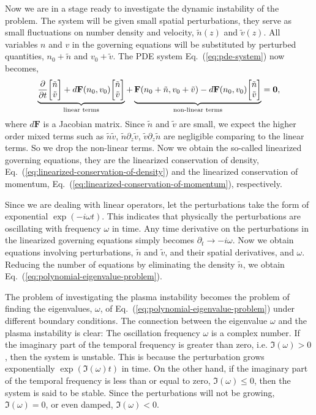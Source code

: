 Now we are in a stage ready to investigate the dynamic instability of the problem. The system will be given small spatial perturbations, they serve as small fluctuations on number density and velocity, $\tilde{n}(z)$ and $\tilde{v}(z)$. All variables $n$ and $v$ in the governing equations will be substituted by perturbed quantities, $n_0+\tilde{n}$ and $v_0+\tilde{v}$. The PDE system Eq.~(\ref{eq:pde-system}) now becomes,
\begin{equation}
	\underbrace{\pdv{t}\mqty[\tilde{n}\\ \tilde{v}] + d\mathbf{F}(n_0,v_0)\mqty[\tilde{n}\\ \tilde{v}] }_{\text{linear terms}}
	+ \underbrace{\mathbf{F}(n_0+\tilde{n}, v_0+\tilde{v}) - d\mathbf{F}(n_0,v_0)\mqty[\tilde{n}\\ \tilde{v}]}_{\text{non-linear terms}}
	= \mathbf{0},
	\label{eq:perturbed-pde-system}
\end{equation}
where $d\mathbf{F}$ is a Jacobian matrix. Since $\tilde{n}$ and $\tilde{v}$ are small, we expect the higher order mixed terms such as $\tilde{n}\tilde{v}$, $\tilde{n}\partial_z\tilde{v}$, $\tilde{v}\partial_z\tilde{n}$ are negligible comparing to the linear terms. So we drop the non-linear terms. Now we obtain the so-called linearized governing equations, they are the linearized conservation of density, Eq.~(\ref{eq:linearized-conservation-of-density}) and the linearized conservation of momentum, Eq.~(\ref{eq:linearized-conservation-of-momentum}), respectively.

Since we are dealing with linear operators, let the perturbations take the form of exponential $\exp(-i\omega t)$. This indicates that physically the perturbations are oscillating with frequency $\omega$ in time. Any time derivative on the perturbations in the linearized governing equations simply becomes $\partial_t \to -i\omega$. Now we obtain equations involving perturbations, $\tilde{n}$ and $\tilde{v}$, and their spatial derivatives, and $\omega$. Reducing the number of equations by eliminating the density $\tilde{n}$, we obtain Eq.~(\ref{eq:polynomial-eigenvalue-problem}).

The problem of investigating the plasma instability becomes the problem of finding the eigenvalues, $\omega$, of Eq.~(\ref{eq:polynomial-eigenvalue-problem}) under different boundary conditions. The connection between the eigenvalue $\omega$ and the plasma instability is clear: The oscillation frequency $\omega$ is a complex number. If the imaginary part of the temporal frequency is greater than zero, i.e. $\Im(\omega) > 0$, then the system is unstable. This is because the perturbation grows exponentially $\exp(\Im(\omega)t)$ in time. On the other hand, if the imaginary part of the temporal frequency is less than or equal to zero, $\Im(\omega) \leq 0$, then the system is said to be stable. Since the perturbations will not be growing, $\Im(\omega)=0$, or even damped, $\Im(\omega) < 0$.


